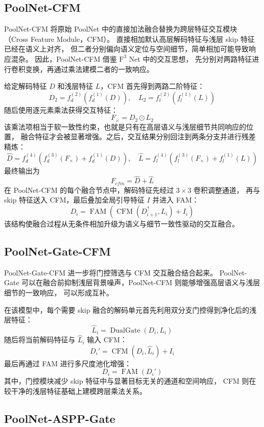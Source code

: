 \documentclass[UTF8,a4paper,10pt]{ctexart}
\begin{document}
\subsection{PoolNet-CFM}

PoolNet-CFM 将原始 PoolNet 中的直接加法融合替换为跨层特征交互模块（Cross Feature Module，CFM）。
直接相加默认高层解码特征与浅层 skip 特征已经在语义上对齐，
但二者分别偏向语义定位与空间细节，简单相加可能导致响应混杂。
因此，PoolNet-CFM 借鉴 \(\text{F}^3\) Net 中的交互思想，
先分别对两路特征进行卷积变换，再通过乘法建模二者的一致响应。

给定解码特征 \(D\) 和浅层特征 \(L\)，CFM 首先得到两路二阶特征：
\[
D_2 = f_d^{(2)}(f_d^{(1)}(D)),
\quad
L_2 = f_l^{(2)}(f_l^{(1)}(L))
\]
随后使用逐元素乘法获得交互特征：
\[
F_{\times} = D_2 \odot L_2
\]
该乘法项相当于软一致性约束，也就是只有在高层语义与浅层细节共同响应的位置，
融合特征才会被显著增强。之后，交互结果分别回注到两条分支并进行残差精炼：
\[
\hat{D}
=
f_d^{(4)}
\left(
f_d^{(3)}(F_{\times}) + f_d^{(1)}(D)
\right),
\quad
\hat{L}
=
f_l^{(4)}
\left(
f_l^{(3)}(F_{\times}) + f_l^{(1)}(L)
\right)
\]
最终输出为
\[
F_{cfm} = \hat{D} + \hat{L}
\]
在 PoolNet-CFM 的每个融合节点中，解码特征先经过 \(3\times3\) 卷积调整通道，
再与 skip 特征送入 CFM，最后叠加全局引导特征 \(I\) 并进入 FAM：
\[
D_i
=
\operatorname{FAM}
\left(
\operatorname{CFM}(D_{i+1}^{\uparrow},L_i)+I_i
\right)
\]
该结构使融合过程从无条件相加升级为语义与细节一致性驱动的交互融合。

\subsection{PoolNet-Gate-CFM}

PoolNet-Gate-CFM 进一步将门控筛选与 CFM 交互融合结合起来。
PoolNet-Gate 可以在融合前抑制浅层背景噪声，PoolNet-CFM 则能够增强高层语义与浅层细节的一致响应，
可以形成互补。

在该模型中，每个需要 skip 融合的解码单元首先利用双分支门控得到净化后的浅层特征：
\[
\hat{L}_i
=
\operatorname{DualGate}(D_i,L_i)
\]
随后将当前解码特征与 \(\hat{L}_i\) 输入 CFM：
\[
D_i'
=
\operatorname{CFM}(D_i,\hat{L}_i)+I_i
\]
最后再通过 FAM 进行多尺度池化增强：
\[
D_i
=
\operatorname{FAM}(D_i')
\]
其中，门控模块减少 skip 特征中与显著目标无关的通道和空间响应，
CFM 则在较干净的浅层特征基础上建模跨层乘法关系。

\subsection{PoolNet-ASPP-Gate}
\end{document}
